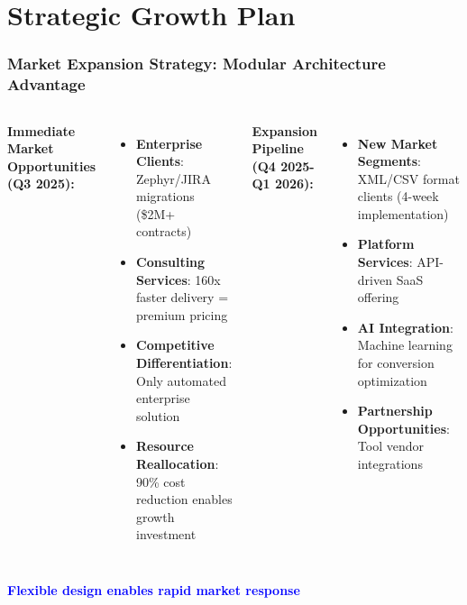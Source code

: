 
\section{Strategic Growth Plan}
\begin{frame}
\frametitle{Market Expansion Strategy: Modular Architecture Advantage}
\begin{columns}
\textbf{Immediate Market Opportunities (Q3 2025):}
\begin{itemize}
    \item \textbf{Enterprise Clients}: Zephyr/JIRA migrations (\$2M+ contracts)
    \item \textbf{Consulting Services}: 160x faster delivery = premium pricing
    \item \textbf{Competitive Differentiation}: Only automated enterprise solution
    \item \textbf{Resource Reallocation}: 90\% cost reduction enables growth investment
\end{itemize}

\textbf{Expansion Pipeline (Q4 2025-Q1 2026):}
\begin{itemize}
    \item \textbf{New Market Segments}: XML/CSV format clients (4-week implementation)
    \item \textbf{Platform Services}: API-driven SaaS offering
    \item \textbf{AI Integration}: Machine learning for conversion optimization
    \item \textbf{Partnership Opportunities}: Tool vendor integrations
\end{itemize}
\end{columns}

\vspace{0.3cm}
\begin{center}
\textcolor{blue}{\textbf{Flexible design enables rapid market response}}
\end{center}
\end{frame}


